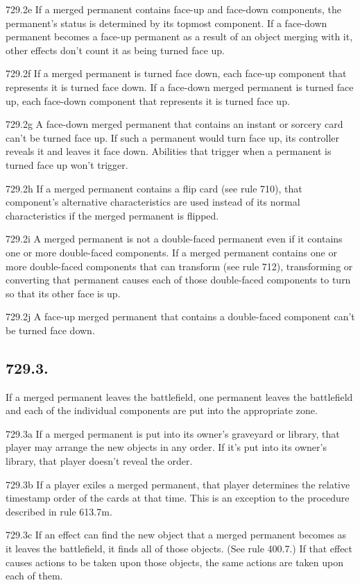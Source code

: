 729.2e If a merged permanent contains face-up and face-down components, the permanent’s status is determined by its topmost component. If a face-down permanent becomes a face-up permanent as a result of an object merging with it, other effects don’t count it as being turned face up.

729.2f If a merged permanent is turned face down, each face-up component that represents it is turned face down. If a face-down merged permanent is turned face up, each face-down component that represents it is turned face up.

729.2g A face-down merged permanent that contains an instant or sorcery card can’t be turned face up. If such a permanent would turn face up, its controller reveals it and leaves it face down. Abilities that trigger when a permanent is turned face up won’t trigger.

729.2h If a merged permanent contains a flip card (see rule 710), that component’s alternative characteristics are used instead of its normal characteristics if the merged permanent is flipped.

729.2i A merged permanent is not a double-faced permanent even if it contains one or more double-faced components. If a merged permanent contains one or more double-faced components that can transform (see rule 712), transforming or converting that permanent causes each of those double-faced components to turn so that its other face is up.

729.2j A face-up merged permanent that contains a double-faced component can’t be turned face down.

\subsection*{729.3.}
If a merged permanent leaves the battlefield, one permanent leaves the battlefield and each of the individual components are put into the appropriate zone.

729.3a If a merged permanent is put into its owner’s graveyard or library, that player may arrange the new objects in any order. If it’s put into its owner’s library, that player doesn’t reveal the order.

729.3b If a player exiles a merged permanent, that player determines the relative timestamp order of the cards at that time. This is an exception to the procedure described in rule 613.7m.

729.3c If an effect can find the new object that a merged permanent becomes as it leaves the battlefield, it finds all of those objects. (See rule 400.7.) If that effect causes actions to be taken upon those objects, the same actions are taken upon each of them.

